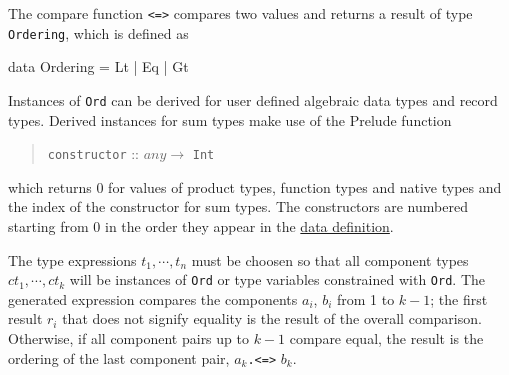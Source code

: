 The compare function \texttt{<=>} compares two values and returns a result of type \texttt{Ordering}, which is defined as
\begin{code}
    data Ordering = Lt | Eq | Gt
\end{code}

Instances of \texttt{Ord} can be derived for user defined algebraic data types and record types. Derived instances for sum types make use of the Prelude function
\begin{quote}
\texttt{constructor} :: $any \rightarrow$ \texttt{Int}
\end{quote}
which returns 0 for values of product types, function types and native types and the index of the constructor for sum types. The constructors are numbered starting from 0 in the order they appear in the \hyperref[datadcl]{data definition}.

The type expressions $t_1, \cdots, t_n$ must be choosen so that all component types $ct_1, \cdots, ct_k$ will be instances of \texttt{Ord} or type variables constrained with \texttt{Ord}. The generated expression compares the components $a_i$, $b_i$ from 1 to $k-1$; the first result $r_i$ that does not signify equality is the result of the overall comparison. Otherwise, if all component pairs up to ${k-1}$ compare equal, the result is the ordering of the last component pair, $a_k$\texttt{.<=>} $b_k$.

